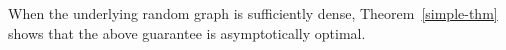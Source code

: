 When the underlying random graph is sufficiently dense, Theorem~\ref{simple-thm} shows that the above guarantee is asymptotically optimal.  
%
%
%
%
%
%

